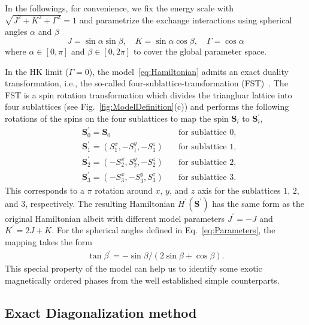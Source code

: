 \documentclass[aps,prb,reprint,amsfonts,amsmath,amssymb,showpacs,groupedaddress,superscriptaddress]{revtex4-1}
\begin{document}
In the followings, for convenience, we fix the energy scale with $\sqrt{J^2 + K^2 + \Gamma^2}=1$ and parametrize the exchange interactions using spherical angles $\alpha$ and $\beta$
\begin{equation}
    J = \sin\alpha \sin\beta, \quad
    K = \sin\alpha \cos\beta, \quad
    \Gamma = \cos\alpha
    \label{eq:Parameters}
\end{equation}
where $\alpha \in [0, \pi]$ and $\beta \in [0, 2\pi]$ to cover the global parameter space.

In the HK limit ($\Gamma=0$), the model~\eqref{eq:Hamiltonian} admits an exact duality transformation, i.e., the so-called four-sublattice-transformation (FST)~\cite{PhysRevB.89.014414}. The FST is a spin rotation transformation which divides the triangluar lattice into four sublattices (see Fig.~\ref{fig:ModelDefinition}(c)) and performs the following rotations of the spins on the four sublattices to map the spin $\bm{S}_{i}$ to $\bm{S}_{i}^{\prime}$,
\begin{align*}
    & \bm{S}_{0}^{\prime} = \bm{S}_{0}& \quad \text{for sublattice 0}, \\
    & \bm{S}_{1}^{\prime} = (S_1^x, -S_1^y, -S_1^z)& \quad \text{for sublattice 1}, \\
    & \bm{S}_{2}^{\prime} = (-S_2^x, S_2^y, -S_2^z)& \quad \text{for sublattice 2}, \\
    & \bm{S}_{3}^{\prime} = (-S_3^x, -S_3^y, S_3^z)& \quad \text{for sublattice 3}.
\end{align*}
This corresponds to a $\pi$ rotation around $x$, $y$, and $z$ axis for the sublattices $1$, $2$, and $3$, respectively. The resulting Hamiltonian $H^{\prime}(\bm{S}^{\prime})$ has the same form as the original Hamiltonian albeit with different model parameters $J^{\prime} = -J$ and $K^{\prime} = 2J + K$. For the spherical angles defined in Eq.~\eqref{eq:Parameters}, the mapping takes the form
\begin{align}
    \tan\beta^{\prime} = -\sin\beta / (2\sin\beta + \cos\beta).
    \label{eq:FST}
\end{align}
This special property of the model can help us to identify some exotic magnetically ordered phases from the well established simple counterparts.


\subsection{\label{subsec:MethodED}Exact Diagonalization method}
\end{document}
